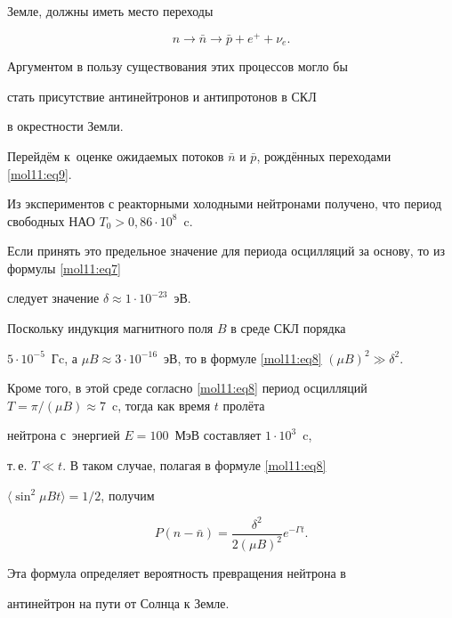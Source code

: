  Земле, должны иметь место переходы

 \begin{equation}

  \label{mol11:eq9}

 n \to \bar  n \to \bar  p + e^+ + \nu_e.

  \end{equation}

 Аргументом в пользу существования  этих процессов могло бы

стать присутствие  антинейтронов и антипротонов в СКЛ

в окрестности Земли.



 Перейдём к~оценке ожидаемых потоков $\bar  n$  и  $\bar  p$,  рождённых переходами \eqref{mol11:eq9}. 

Из экспериментов с реакторными  холодными нейтронами \cite{mol3} получено, что период свободных  НАО $T_0  >   0,86  \cdot 10^8$~c. 

Если принять это предельное значение  для периода осцилляций за основу, то из формулы \eqref{mol11:eq7}

следует значение $\delta \approx 1 \cdot 10^{-23}$~эВ. 

Поскольку  индукция магнитного  поля $B$ в среде СКЛ порядка

 $ 5 \cdot 10^{-5}$~Гc, а $\mu B \approx 3 \cdot  10^{-16}$~эВ, то в формуле \eqref{mol11:eq8} $(\mu B)^2 \gg \delta^2$.

 Кроме того, в этой среде согласно \eqref{mol11:eq8} период осцилляций  $T =\pi/(\mu B) \approx  7$~c, тогда как время $t$ пролёта

нейтрона с~энергией $E =100$~МэВ составляет $1 \cdot 10^3$~c,

  т.\,е. $T \ll t$. В таком  случае, полагая в формуле \eqref{mol11:eq8}

 ${\langle}\sin^2{\mu  B  t \rangle } = 1/2$, получим

 \begin{equation}

  \label{mol11:eq10}

 P(n {-} \bar  n) = \frac{\delta^2}{2  (\mu B)^2} e^{- \Gamma t}.

 \end{equation}

 Эта формула определяет вероятность превращения нейтрона в

 антинейтрон на пути от Солнца к Земле.




